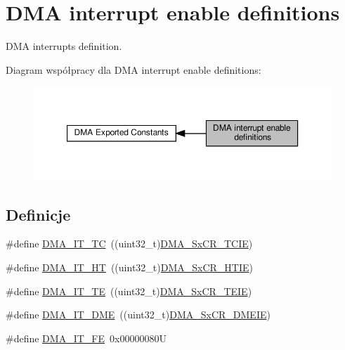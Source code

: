\hypertarget{group___d_m_a__interrupt__enable__definitions}{}\section{D\+MA interrupt enable definitions}
\label{group___d_m_a__interrupt__enable__definitions}


D\+MA interrupts definition.  


Diagram współpracy dla D\+MA interrupt enable definitions\+:\nopagebreak
\begin{figure}[H]
\begin{center}
\leavevmode
\includegraphics[width=350pt]{group___d_m_a__interrupt__enable__definitions}
\end{center}
\end{figure}
\subsection*{Definicje}
\begin{DoxyCompactItemize}
\item 
\#define \hyperlink{group___d_m_a__interrupt__enable__definitions_ga06e83dd277e0d3e5635cf8ce8dfd6e16}{D\+M\+A\+\_\+\+I\+T\+\_\+\+TC}~((uint32\+\_\+t)\hyperlink{group___peripheral___registers___bits___definition_ga6ae47cc2cd2e985d29cb6b0bb65da1d7}{D\+M\+A\+\_\+\+Sx\+C\+R\+\_\+\+T\+C\+IE})
\item 
\#define \hyperlink{group___d_m_a__interrupt__enable__definitions_gadf11c572b9797e04a14b105fdc2e5f66}{D\+M\+A\+\_\+\+I\+T\+\_\+\+HT}~((uint32\+\_\+t)\hyperlink{group___peripheral___registers___bits___definition_ga13a7fe097608bc5031d42ba69effed20}{D\+M\+A\+\_\+\+Sx\+C\+R\+\_\+\+H\+T\+IE})
\item 
\#define \hyperlink{group___d_m_a__interrupt__enable__definitions_gaf9d92649d2a0146f663ff253d8f3b59e}{D\+M\+A\+\_\+\+I\+T\+\_\+\+TE}~((uint32\+\_\+t)\hyperlink{group___peripheral___registers___bits___definition_gaeee99c36ba3ea56cdb4f73a0b01fb602}{D\+M\+A\+\_\+\+Sx\+C\+R\+\_\+\+T\+E\+IE})
\item 
\#define \hyperlink{group___d_m_a__interrupt__enable__definitions_ga71137443f7bdced1ee80697596e9ea98}{D\+M\+A\+\_\+\+I\+T\+\_\+\+D\+ME}~((uint32\+\_\+t)\hyperlink{group___peripheral___registers___bits___definition_gacaecc56f94a9af756d077cf7df1b6c41}{D\+M\+A\+\_\+\+Sx\+C\+R\+\_\+\+D\+M\+E\+IE})
\item 
\#define \hyperlink{group___d_m_a__interrupt__enable__definitions_ga93164ec039fc5579662c382e68d7d13f}{D\+M\+A\+\_\+\+I\+T\+\_\+\+FE}~0x00000080U
\end{DoxyCompactItemize}


